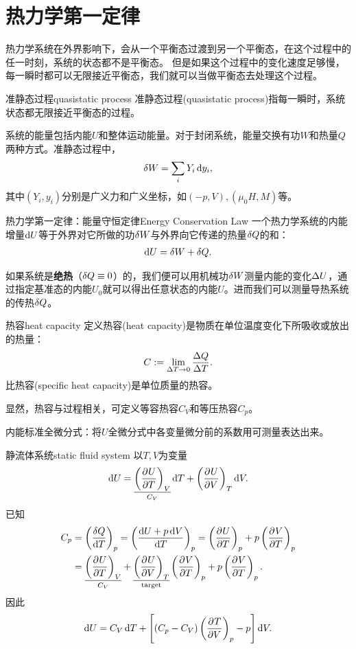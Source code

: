 \section{热力学第一定律}

热力学系统在外界影响下，会从一个平衡态过渡到另一个平衡态，在这个过程中的任一时刻，系统的状态都不是平衡态。
但是如果这个过程中的变化速度足够慢，每一瞬时都可以无限接近平衡态，我们就可以当做平衡态去处理这个过程。

\begin{definition}{准静态过程}{quasistatic process}
	准静态过程(quasistatic process)指每一瞬时，系统状态都无限接近平衡态的过程。
\end{definition}

系统的能量包括内能$U$和整体运动能量。对于封闭系统，能量交换有功$W$和热量$Q$两种方式。准静态过程中，
\begin{align}
	\vd W=\sum_iY_i\d y_i,
\end{align}
其中$(Y_i,y_i)$分别是广义力和广义坐标，如$(-p,V),(\mu_0H,M)$等。

\begin{theorem}{热力学第一定律：能量守恒定律}{Energy Conservation Law}
	一个热力学系统的内能增量$\d U$等于外界对它所做的功$\vd W$与外界向它传递的热量$\vd Q$的和：
	\begin{align}
		\d U=\vd W+\vd Q.
	\end{align}
\end{theorem}

\begin{remark}
	如果系统是\textbf{绝热}（$\vd Q\equiv 0$）的，我们便可以用机械功$\vd W$测量内能的变化$\D U$，通过指定基准态的内能$U_0$就可以得出任意状态的内能$U$。进而我们可以测量导热系统的传热$\vd Q$。
\end{remark}

\begin{definition}{热容}{heat capacity}
	定义热容(heat capacity)是物质在单位温度变化下所吸收或放出的热量：
	\begin{equation}
		C:=\lim_{\D T\to0}\frac{\D Q}{\D T}.
	\end{equation}
	比热容(specific heat capacity)是单位质量的热容。
\end{definition}

\begin{remark}
	显然，热容与过程相关，可定义等容热容$C_V$和等压热容$C_p$。
\end{remark}

内能标准全微分式：将$U$全微分式中各变量微分前的系数用可测量表达出来。
\begin{example}{静流体系统}{static fluid system}
	以$T,V$为变量
	\[
		\d U=\underset{C_V}{\underline{\kh{\pv UT}_V}}\d T+\kh{\pv UV}_T\d V.
	\]
	已知 
	\begin{align*}
		C_p&=\kh{\frac{\vd Q}{\d T}}_p=\kh{\frac{\d U+p\d V}{\d T}}_p=\kh{\pv UT}_p+p\kh{\pv VT}_p\\
		&=\underset{C_V}{\underline{\kh{\pv UT}_V}}+\underset{\text{target}}{\underline{\kh{\pv UV}_T}}\kh{\pv VT}_p+p\kh{\pv VT}_p.
	\end{align*}
	因此
	\begin{align}
		\d U=C_V\d T+\fkh{(C_p-C_V)\kh{\pv TV}_p-p}\d V.
	\end{align}
\end{example}

